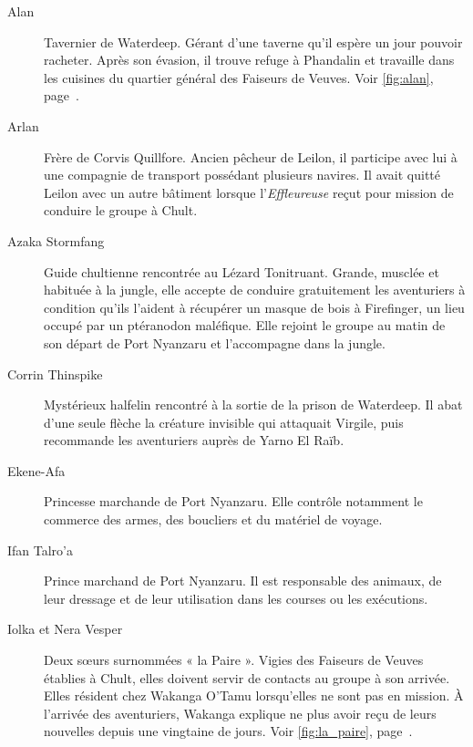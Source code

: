 \begin{description}
    \item[Alan]
    Tavernier de Waterdeep. Gérant d'une taverne qu'il espère un jour pouvoir
    racheter. Après son évasion, il trouve refuge à Phandalin et travaille dans
    les cuisines du quartier général des Faiseurs de Veuves.
    Voir \autoref{fig:alan}, page~\pageref{fig:alan}.

    \item[Arlan]
    Frère de Corvis Quillfore. Ancien pêcheur de Leilon, il participe avec lui
    à une compagnie de transport possédant plusieurs navires. Il avait quitté
    Leilon avec un autre bâtiment lorsque l'\textit{Effleureuse} reçut pour
    mission de conduire le groupe à Chult.

    \item[Azaka Stormfang]
    Guide chultienne rencontrée au Lézard Tonitruant. Grande, musclée et
    habituée à la jungle, elle accepte de conduire gratuitement les
    aventuriers à condition qu'ils l'aident à récupérer un masque de bois à
    Firefinger, un lieu occupé par un ptéranodon maléfique. Elle rejoint le
    groupe au matin de son départ de Port Nyanzaru et l'accompagne dans la
    jungle.

    \item[Corrin Thinspike]
    Mystérieux halfelin rencontré à la sortie de la prison de Waterdeep. Il
    abat d'une seule flèche la créature invisible qui attaquait Virgile, puis
    recommande les aventuriers auprès de Yarno El Raïb.

    \item[Ekene-Afa]
    Princesse marchande de Port Nyanzaru. Elle contrôle notamment
    le commerce des armes, des boucliers et du matériel de voyage.

    \item[Ifan Talro'a]
    Prince marchand de Port Nyanzaru. Il est responsable des
    animaux, de leur dressage et de leur utilisation dans les courses ou les
    exécutions.

    \item[Iolka et Nera Vesper]
    Deux sœurs surnommées « la Paire ». Vigies des Faiseurs de Veuves établies
    à Chult, elles doivent servir de contacts au groupe à son arrivée. Elles
    résident chez Wakanga O'Tamu lorsqu'elles ne sont pas en mission. À
    l'arrivée des aventuriers, Wakanga explique ne plus avoir reçu de leurs
    nouvelles depuis une vingtaine de jours.
    Voir \autoref{fig:la_paire}, page~\pageref{fig:la_paire}.


\end{description}
